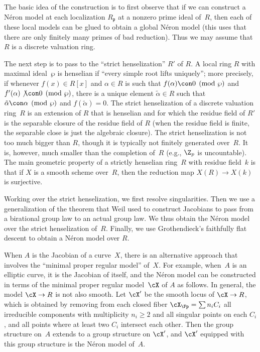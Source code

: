 \documentclass{report}
\begin{document}
The basic idea of the construction is to first observe that if we
can construct a N\'eron model at each localization
$R_{\mathfrak{p}}$ at a nonzero prime ideal of~$R$, then each of
these local models can be glued to obtain a global N\'eron model
(this uses that there are only finitely many primes of bad
reduction).  Thus we may assume that $R$ is a discrete valuation
ring.

The next step is to pass to the ``strict henselization'' $R'$ of
$R$.   A local ring $R$ with maximal ideal~$\wp$ is henselian if
``every simple root lifts uniquely''; more precisely, if whenever
$f(x)\in R[x]$ and $\alpha\in R$ is such that $f(\alpha)\con
0\pmod{\wp}$ and $f'(\alpha)\not\con0\pmod{\wp}$, there is a
unique element $\tilde{\alpha}\in R$ such that $\tilde{\alpha}\con
\alpha\pmod{\wp}$ and $f(\tilde{\alpha})=0$. The strict
henselization of a discrete valuation ring~$R$ is an extension of
$R$ that is henselian and for which the residue field of $R'$ is
the separable closure of the residue field of $R$ (when the
residue field is finite, the separable close is just the algebraic
closure).  The strict henselization is not too much bigger than
$R$, though it is typically not finitely generated over~$R$.  It
is, however, much smaller than the completion of~$R$ (e.g., $\Z_p$
is uncountable).  The main geometric property of a strictly
henselian ring~$R$ with residue field~$k$ is that if $X$ is a
smooth scheme over~$R$, then the reduction map $X(R)\to X(k)$ is
surjective.

Working over the strict henselization, we first resolve
singularities.  Then we use a generalization of the theorem that
Weil used to construct Jacobians to pass from a birational group
law to an actual group law.  We thus obtain the N\'eron model over
the strict henselization of~$R$.  Finally, we use Grothendieck's
faithfully flat descent to obtain a N\'eron model over $R$.

When $A$ is the Jacobian of a curve~$X$, there is an alternative
approach that involves the ``minimal proper regular model''
of~$X$. For example, when~$A$ is an elliptic curve, it is the
Jacobian of itself, and the N\'eron model can be constructed in
terms of the minimal proper regular model~$\cX$ of $A$ as follows.
In general, the model $\cX\to R$ is not also smooth. Let $\cX'$ be
the smooth locus of $\cX\to R$, which is obtained by removing from
each closed fiber $\cX_{\Fp}=\sum n_i C_i$ all irreducible
components with multiplicity $n_i\geq 2$ and all singular points
on each $C_i$, and all points where at least two $C_i$ intersect
each other. Then the group structure on~$A$ extends to a group
structure on $\cX'$, and $\cX'$ equipped with this group structure
is the N\'eron model of~$A$.
\end{document}
